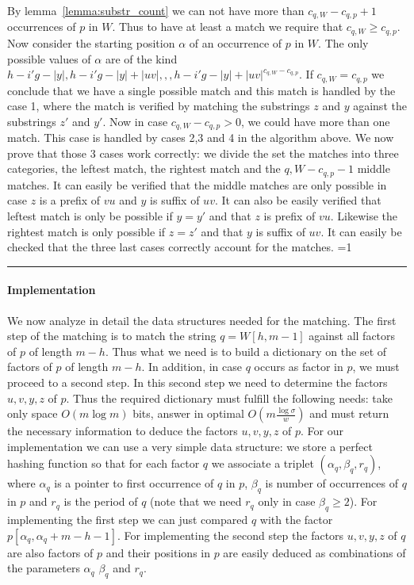 \documentclass{article}
\newcommand{\?}{\mskip1.5mu}
\newcounter{noqed}
\newcommand{\qed}{ \ifmmode\mbox{
}\fi\rule[-.05em]{.3em}{.7em}\setcounter{noqed}{0}}
\newenvironment{proof}[1][{}]{\noindent{\bf Proof#1.
}\setcounter{noqed}{1}}{\ifnum\value{noqed}=1\qed\fi\par\medskip}
\begin{document}
\begin{proof}
By lemma~\ref{lemma:substr_count} we can not have more than $c_{q,W}-c_{q,p}+1$ occurrences of $p$ in $W$. Thus to have at least a match we require that $c_{q,W}\geq c_{q,p}$. Now consider the starting position $\alpha$ of an occurrence of $p$ in $W$. The only possible values of $\alpha$ are of the kind $h-i'g-|y|,h-i'g-|y|+|uv|,,,h-i'g-|y|+|uv|^{c_{q,W}-c_{q,p}}$. If $c_{q,W}=c_{q,p}$ we conclude that we have a single possible match and this match is handled by the case 1, where the match is verified by matching the substrings $z$ and $y$ against the substrings $z'$ and $y'$. Now in case $c_{q,W}-c_{q,p}>0$, we could have more than one match. This case is handled by cases 2,3 and 4 in the algorithm above. 
We now prove that those 3 cases work correctly: we divide the set the matches into three categories, the leftest match, the rightest match and the ${q,W}-c_{q,p}-1$ middle matches. It can easily be verified that the middle matches are only possible in case $z$ is a prefix of $vu$ and $y$ is suffix of $uv$. It can also be easily verified that leftest match is only be possible if $y=y'$ and that $z$ is prefix of $vu$. Likewise the rightest match is only possible if $z=z'$ and that $y$ is suffix of $uv$. It can easily be checked that the three last cases correctly account for the matches. 
\end{proof}
\paragraph{Implementation}
We now analyze in detail the data structures needed for the matching. The first step of the matching is to match the string $q=W[h,m-1]$ against all factors of $p$ of length $m-h$. Thus what we need is to build a dictionary on the set of factors of $p$ of length $m-h$. In addition, in case $q$ occurs as factor in $p$, we must proceed to a second step. In this second step we need to determine the factors $u,v,y,z$ of $p$. 
Thus the required dictionary must fulfill the following needs: take only space $O(m\log m)$ bits, answer in optimal $O(m\frac{\log\sigma}{w})$ and must return the necessary information to deduce the factors $u,v,y,z$ of $p$. 
For our implementation we can use a very simple data structure: we store a perfect hashing function so that for each factor $q$ we associate a triplet $(\alpha_q,\beta_q,r_q)$, where $\alpha_q$ is a pointer to first occurrence of $q$ in $p$, $\beta_q$ is number of occurrences of $q$ in $p$ and $r_q$ is the period of $q$ (note that we need $r_q$ only in case $\beta_q\geq 2$). For implementing the first step we can just compared $q$ with the factor $p[\alpha_q,\alpha_q+m-h-1]$. For implementing the second step the factors $u,v,y,z$ of $q$ are also factors of $p$ and their positions in $p$ are easily deduced as combinations of the parameters $\alpha_q$ $\beta_q$ and $r_q$. 
\end{document}
